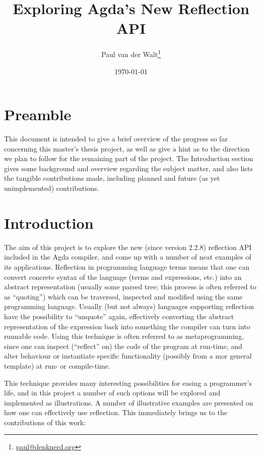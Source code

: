 \documentclass[a4paper]{article}
\author{Paul van der Walt\footnote{\url{paul@denknerd.org}}}
\date{\today}
\title{Exploring Agda's New Reflection API}
\begin{document}
\maketitle


\section{Preamble}

This document is intended to give a brief overview of the progress so far concerning
this master's thesis project, as well as give a hint as to the direction we plan to follow
for the remaining part of the project. The Introduction section gives some background and
overview regarding the subject matter, and also lists
the tangible contributions made, including planned and future (as yet unimplemented) contributions.


\section{Introduction}

The aim of this project is to explore the new (since version 2.2.8) reflection API included in the Agda
compiler, and come up with a number of neat examples of its applications. Reflection in programming language
terms means that one can convert concrete syntax of the language (terms and expressions, etc.) into an abstract
representation (usually some parsed tree; this process is often referred to as ``quoting'')
which can be traversed, inspected and modified using the same programming
language. Usually (but not always) languages supporting reflection have the possibility to
``unquote'' again, effectively
converting the abstract representation of the expression back into something the compiler
can turn into runnable code. Using this technique is often referred to as metaprogramming,
since one can inspect (``reflect'' on) the code of the program at run-time, and alter behaviour
or instantiate specific functionality (possibly from a mor general template) at run- or compile-time.

This technique provides many interesting possibilities for easing a programmer's life, and in
this project a number of such options will be explored and implemented as illustrations. A number of illustrative
examples are presented on how one can effectively use reflection. 
This immediately brings us to the contributions of this work:
\end{document}
